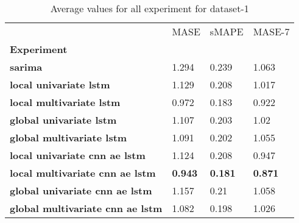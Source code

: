 \begin{table}[h]
\centering
\caption{Average values for all experiment for dataset-1}
\label{table:Average-metric-dataset-1}
\begin{tabular}{llll}
\toprule
{} &            MASE &           sMAPE &          MASE-7 \\
\textbf{Experiment                     } &                 &                 &                 \\
\midrule
\textbf{sarima                         } &           1.294 &           0.239 &           1.063 \\
\textbf{local univariate lstm          } &           1.129 &           0.208 &           1.017 \\
\textbf{local multivariate lstm        } &           0.972 &           0.183 &           0.922 \\
\textbf{global univariate lstm         } &           1.107 &           0.203 &            1.02 \\
\textbf{global multivariate lstm       } &           1.091 &           0.202 &           1.055 \\
\textbf{local univariate cnn ae lstm   } &           1.124 &           0.208 &           0.947 \\
\textbf{local multivariate cnn ae lstm } &  \textbf{0.943} &  \textbf{0.181} &  \textbf{0.871} \\
\textbf{global univariate cnn ae lstm  } &           1.157 &            0.21 &           1.058 \\
\textbf{global multivariate cnn ae lstm} &           1.082 &           0.198 &           1.026 \\
\bottomrule
\end{tabular}
\end{table}
